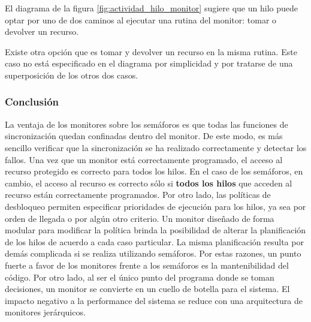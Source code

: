 El diagrama de la figura \ref{fig:actividad_hilo_monitor} sugiere que un
hilo puede optar por uno de dos caminos al ejecutar una rutina del monitor:
tomar o devolver un recurso.

Existe otra opción que es tomar y devolver un recurso en la misma rutina. Este
caso no está especificado en el diagrama por simplicidad y por tratarse de una
superposición de los otros dos casos.

\subsubsection{Conclusión}
La ventaja de los monitores sobre los semáforos es que todas
las funciones de sincronización quedan confinadas dentro del monitor. De este
modo, es más sencillo verificar que la sincronización se ha realizado
correctamente y detectar los fallos. Una vez que un monitor está
correctamente programado, el acceso al recurso protegido es correcto para todos
los hilos. En el caso de los semáforos, en cambio, el acceso al recurso es
correcto sólo si \textbf{todos los hilos} que acceden al recurso están
correctamente programados.\cite{SistOpStallings} Por otro lado, las políticas
de desbloqueo permiten especificar prioridades de ejecución para los hilos,
ya sea por orden de llegada o por algún otro criterio. Un monitor diseñado de
forma modular para modificar la política brinda la posibilidad de alterar la
planificación de los hilos de acuerdo a cada caso particular. La misma
planificación resulta por demás complicada si se realiza utilizando semáforos.
Por estas razones, un punto fuerte a favor de los monitores frente a los
semáforos es la mantenibilidad del código. Por otro lado, al ser el único punto
del programa donde se toman decisiones, un monitor se convierte en un cuello de
botella para el sistema. El impacto negativo a la performance del sistema se
reduce con una arquitectura de monitores jerárquicos.
